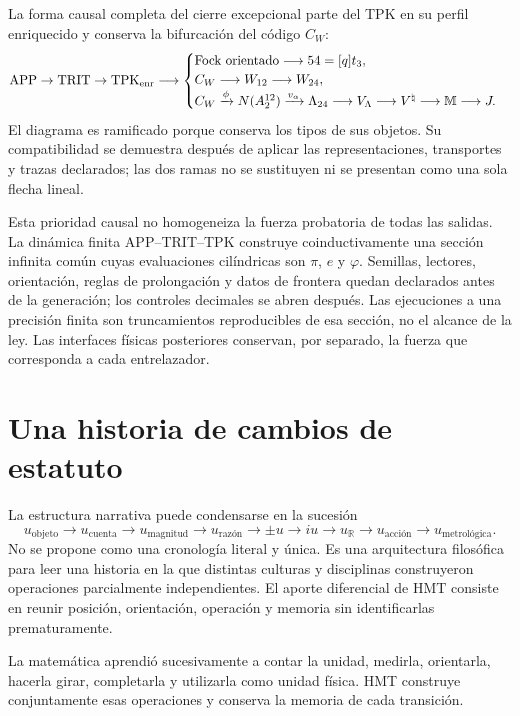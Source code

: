 La forma causal completa del cierre excepcional parte del TPK en su perfil
enriquecido y conserva la bifurcación del código \(C_W\):
\[
\mathrm{APP}\to\mathrm{TRIT}\to\mathrm{TPK}_{\rm enr}
\longrightarrow
\begin{cases}
\text{Fock orientado}\longrightarrow54=[q]t_3,\\
 C_W\longrightarrow W_{12}\longrightarrow W_{24},\\
 C_W\xrightarrow{\phi}N(A_2^{12})
 \xrightarrow{v_\alpha}\Lambda_{24}
 \longrightarrow V_\Lambda\longrightarrow V^\natural
 \longrightarrow\mathbb M\longrightarrow J.
\end{cases}
\]
El diagrama es ramificado porque conserva los tipos de sus objetos. Su
compatibilidad se demuestra después de aplicar las representaciones,
transportes y trazas declarados; las dos ramas no se sustituyen ni se
presentan como una sola flecha lineal.

Esta prioridad causal no homogeneiza la fuerza probatoria de todas las
salidas. La dinámica finita APP--TRIT--TPK construye coinductivamente una
sección infinita común cuyas evaluaciones cilíndricas son
\(\pi\), \(e\) y \(\varphi\). Semillas, lectores, orientación, reglas de
prolongación y datos de frontera quedan declarados antes de la generación;
los controles decimales se abren después. Las ejecuciones a una precisión
finita son truncamientos reproducibles de esa sección, no el alcance de la
ley. Las interfaces físicas posteriores conservan, por separado, la fuerza
que corresponda a cada entrelazador.

\section*{Una historia de cambios de estatuto}

La estructura narrativa puede condensarse en la sucesión
\[
u_{\text{objeto}}
\longrightarrow
u_{\text{cuenta}}
\longrightarrow
u_{\text{magnitud}}
\longrightarrow
u_{\text{razón}}
\longrightarrow
\pm u
\longrightarrow
iu
\longrightarrow
u_{\mathbb R}
\longrightarrow
u_{\text{acción}}
\longrightarrow
u_{\text{metrológica}}.
\]
No se propone como una cronología literal y única. Es una arquitectura
filosófica para leer una historia en la que distintas culturas y disciplinas
construyeron operaciones parcialmente independientes. El aporte diferencial
de HMT consiste en reunir posición, orientación, operación y memoria sin
identificarlas prematuramente.

\begin{readingbox}
La matemática aprendió sucesivamente a contar la unidad, medirla, orientarla,
hacerla girar, completarla y utilizarla como unidad física. HMT construye
conjuntamente esas operaciones y conserva la memoria de cada transición.
\end{readingbox}

